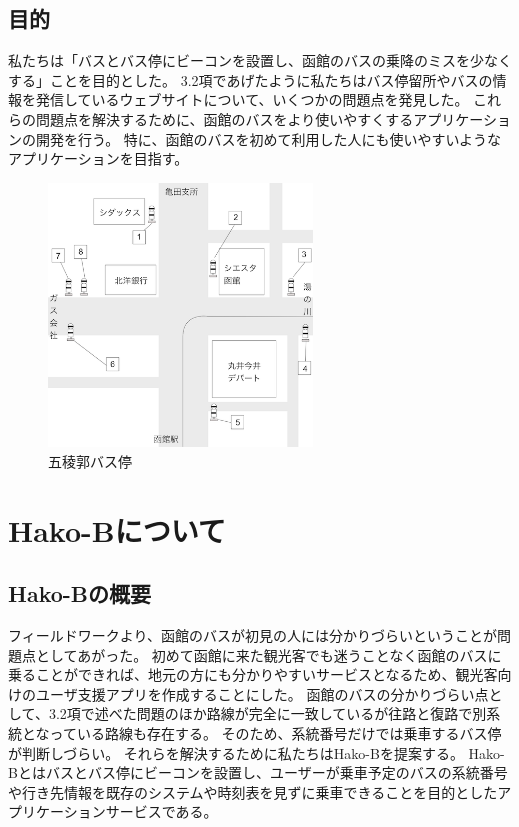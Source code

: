 \documentclass[openany,11pt,papersize]{jsbook}
\begin{document}

\section{目的}\label{sec:gaiyou}
私たちは「バスとバス停にビーコンを設置し、函館のバスの乗降のミスを少なくする」ことを目的とした。
3.2項であげたように私たちはバス停留所やバスの情報を発信しているウェブサイトについて、いくつかの問題点を発見した。
これらの問題点を解決するために、函館のバスをより使いやすくするアプリケーションの開発を行う。
特に、函館のバスを初めて利用した人にも使いやすいようなアプリケーションを目指す。


\begin{figure}[htbp]
  \begin{center}
    \includegraphics[clip,width=7.0cm]{img/14007.png}
    \caption{五稜郭バス停}
    \label{fig:goryo}
  \end{center}
\end{figure}

\chapter{Hako-Bについて}

\section{Hako-Bの概要}
フィールドワークより、函館のバスが初見の人には分かりづらいということが問題点としてあがった。
初めて函館に来た観光客でも迷うことなく函館のバスに乗ることができれば、地元の方にも分かりやすいサービスとなるため、観光客向けのユーザ支援アプリを作成することにした。
函館のバスの分かりづらい点として、3.2項で述べた問題のほか路線が完全に一致しているが往路と復路で別系統となっている路線も存在する。
そのため、系統番号だけでは乗車するバス停が判断しづらい。
それらを解決するために私たちはHako-Bを提案する。
Hako-Bとはバスとバス停にビーコンを設置し、ユーザーが乗車予定のバスの系統番号や行き先情報を既存のシステムや時刻表を見ずに乗車できることを目的としたアプリケーションサービスである。
\end{document}
